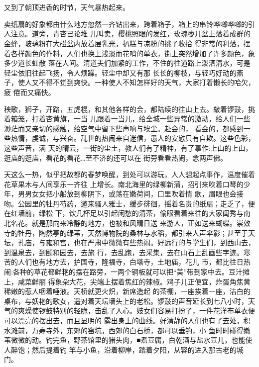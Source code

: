 \documentclass[11pt,a4paper,onecolumn]{article}
\begin{document}
\pagebreak
\section{}

又到了朝顶进香的时节，天气暴热起来。

卖纸扇的好象都由什么地方忽然一齐钻出来，跨着箱子，箱上的串铃哗啷哗啷的引人注意。道旁，青杏已论堆
儿叫卖，樱桃照眼的发红，玫瑰枣儿盆上落着成群的金蜂，玻璃粉在大磁盆内放着层乳光，扒糕与凉粉的挑子收拾
得非常的利落，摆着各样颜色的作料，人们也换上浅淡而花哨的单衣，街上突然增加了许多颜色，象多少道长虹散
落在人间。清道夫们加紧的工作，不住的往道路上泼洒清水，可是轻尘依旧往起飞扬，令人烦躁。轻尘中却又有那
长长的柳枝，与轻巧好动的燕子，使人又不得不觉到爽快。一种使人不知怎样好的天气，大家打着懒长的哈欠，疲
倦而又痛快。

秧歌，狮子，开路，五虎棍，和其他各样的会，都陆续的往山上去。敲着锣鼓，挑着箱笼，打着杏黄旗，一当
儿跟着一当儿，给全城一些异常的激动，给人们一些渺茫而又亲切的感触，给空气中留下些声响与埃尘。赴会的，
看会的，都感到一些热情，虔诚，与兴奋。乱世的热闹来自迷信，愚人的安慰只有自欺。这些色彩，这些声音，满
天的晴云，一街的尘土，教人们有了精神，有了事作:上山的上山，逛庙的逛庙，看花的看花\ldots 至不济的还可以在
街旁看看热闹，念两声佛。

天这么一热，似乎把故都的春梦唤醒，到处可以游玩，人人想起点事作，温度催着花草果木与人间享乐一齐往
上增长。南北海里的绿柳新蒲，招引来吹着口琴的少年，男男女女把小船放到柳阴下，或荡在嫩荷间，口里吹着情
歌，眉眼也会接吻。公园里的牡丹芍药，邀来骚人雅士，缓步徘徊，摇着名贵的纸扇；走乏了，便在红墙前，绿松
下，饮几杯足以引起闲愁的清茶，偷眼看着来往的大家闺秀与南北名花。就是那向来冷静的地方，也被和风晴日送
来游人，正如送来蝴蝶。崇效寺的牡丹，陶然亭的绿苇，天然博物院的桑林与水稻，都引来人声伞影；甚至于天
坛，孔庙，与雍和宫，也在严肃中微微有些热闹。好远行的与学生们，到西山去，到温泉去，到颐和园去，去旅
行，去乱跑，去采集，去在山石上乱画些字迹。寒苦的人们也有地方去，护国寺，隆福寺，白塔寺，土地庙，花儿
市，都比往日热闹:各种的草花都鲜艳的摆在路旁，一两个铜板就可以把``美''带到家中去。豆汁摊上，咸菜鲜丽
得象朵大花，尖端上摆着焦红的辣椒。鸡子儿正便宜，炸蛋角焦黄稀嫩的惹人咽着唾液。天桥就更火炽，新席造起
的茶棚，一座挨着一座，洁白的桌布，与妖艳的歌女，遥对着天坛墙头上的老松。锣鼓的声音延长到七八小时，天
气的爽燥使锣鼓特别的轻脆，击乱了人心。妓女们容易打扮了，一件花洋布单衣便可以漂亮的摆出去，而且显明的
露出身上的曲线。好清静的人们也有了去处，积水滩前，万寿寺外，东郊的窑坑，西郊的白石桥，都可以垂钓，小
鱼时时碰得嫩苇微微的动。钓完鱼，野茶馆里的猪头肉，■煮豆腐，白乾酒与盐水豆儿，也能使人醉饱；然后提着钓
竿与小鱼，沿着柳岸，踏着夕阳，从容的进入那古老的城门。
\end{document}
